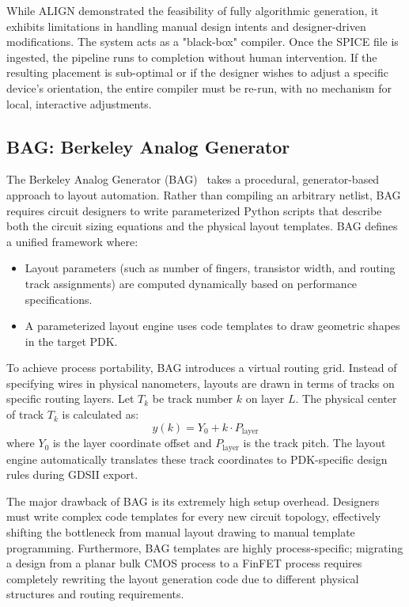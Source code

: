 While ALIGN demonstrated the feasibility of fully algorithmic generation, it exhibits limitations in handling manual design intents and designer-driven modifications. The system acts as a "black-box" compiler. Once the SPICE file is ingested, the pipeline runs to completion without human intervention. If the resulting placement is sub-optimal or if the designer wishes to adjust a specific device's orientation, the entire compiler must be re-run, with no mechanism for local, interactive adjustments.

\subsection{BAG: Berkeley Analog Generator}

The Berkeley Analog Generator (BAG)~\cite{align} takes a procedural, generator-based approach to layout automation. Rather than compiling an arbitrary netlist, BAG requires circuit designers to write parameterized Python scripts that describe both the circuit sizing equations and the physical layout templates. BAG defines a unified framework where:
\begin{itemize}
    \item Layout parameters (such as number of fingers, transistor width, and routing track assignments) are computed dynamically based on performance specifications.
    \item A parameterized layout engine uses code templates to draw geometric shapes in the target PDK.
\end{itemize}

To achieve process portability, BAG introduces a virtual routing grid. Instead of specifying wires in physical nanometers, layouts are drawn in terms of tracks on specific routing layers. Let $T_k$ be track number $k$ on layer $L$. The physical center of track $T_k$ is calculated as:
\begin{equation}
    y(k) = Y_0 + k \cdot P_{\text{layer}}
\end{equation}
where $Y_0$ is the layer coordinate offset and $P_{\text{layer}}$ is the track pitch. The layout engine automatically translates these track coordinates to PDK-specific design rules during GDSII export.

The major drawback of BAG is its extremely high setup overhead. Designers must write complex code templates for every new circuit topology, effectively shifting the bottleneck from manual layout drawing to manual template programming. Furthermore, BAG templates are highly process-specific; migrating a design from a planar bulk CMOS process to a FinFET process requires completely rewriting the layout generation code due to different physical structures and routing requirements.

